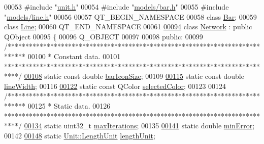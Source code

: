 \begin{DoxyCode}
00053 \textcolor{preprocessor}{#include "\hyperlink{unit_8h}{unit.h}"}
00054 \textcolor{preprocessor}{#include "\hyperlink{bar_8h}{models/bar.h}"}
00055 \textcolor{preprocessor}{#include "\hyperlink{line_8h}{models/line.h}"}
00056 
00057 QT\_BEGIN\_NAMESPACE
00058 \textcolor{keyword}{class }\hyperlink{class_bar}{Bar};
00059 \textcolor{keyword}{class }\hyperlink{class_line}{Line};
00060 QT\_END\_NAMESPACE
00061 
\hypertarget{network_8h_source_l00094}{}\hyperlink{class_network}{00094} \textcolor{keyword}{class }\hyperlink{class_network}{Network} : \textcolor{keyword}{public} QObject
00095 \{
00096   Q\_OBJECT
00097 
00098 \textcolor{keyword}{public}:
00099   \textcolor{comment}{/*****************************************************************************}
00100 \textcolor{comment}{   * Constant data.}
00101 \textcolor{comment}{   ****************************************************************************/}
\hypertarget{network_8h_source_l00108}{}\hyperlink{group___models_gaa334bbc93b3fde219840e95e23198b53}{00108}   \textcolor{keyword}{static} \textcolor{keyword}{const} \textcolor{keywordtype}{double} \hyperlink{group___models_gaa334bbc93b3fde219840e95e23198b53}{barIconSize};
00109 
\hypertarget{network_8h_source_l00115}{}\hyperlink{group___models_ga3f810634c9908d62d33a1ab09a76c147}{00115}   \textcolor{keyword}{static} \textcolor{keyword}{const} \textcolor{keywordtype}{double} \hyperlink{group___models_ga3f810634c9908d62d33a1ab09a76c147}{lineWidth};
00116 
\hypertarget{network_8h_source_l00122}{}\hyperlink{group___models_gaa9e21b8e2a24b0495e776a51e1aeed94}{00122}   \textcolor{keyword}{static} \textcolor{keyword}{const} QColor \hyperlink{group___models_gaa9e21b8e2a24b0495e776a51e1aeed94}{selectedColor};
00123 
00124   \textcolor{comment}{/*****************************************************************************}
00125 \textcolor{comment}{   * Static data.}
00126 \textcolor{comment}{   ****************************************************************************/}
\hypertarget{network_8h_source_l00134}{}\hyperlink{group___models_ga318dee060bc577eacd67d332efbbe1b2}{00134}   \textcolor{keyword}{static} uint32\_t \hyperlink{group___models_ga318dee060bc577eacd67d332efbbe1b2}{maxIterations};
00135 
\hypertarget{network_8h_source_l00141}{}\hyperlink{group___models_gabcdc973129d3dda7572b7a1c388da1b5}{00141}   \textcolor{keyword}{static} \textcolor{keywordtype}{double} \hyperlink{group___models_gabcdc973129d3dda7572b7a1c388da1b5}{minError};
00142 
\hypertarget{network_8h_source_l00148}{}\hyperlink{group___models_gae46c0e2bf39b343875e3c69066fe2652}{00148}   \textcolor{keyword}{static} \hyperlink{class_unit_a8c8921f7b225ad6063b1cb573425b9a0}{Unit::LengthUnit} \hyperlink{group___models_gae46c0e2bf39b343875e3c69066fe2652}{lengthUnit};

\end{DoxyCode}
